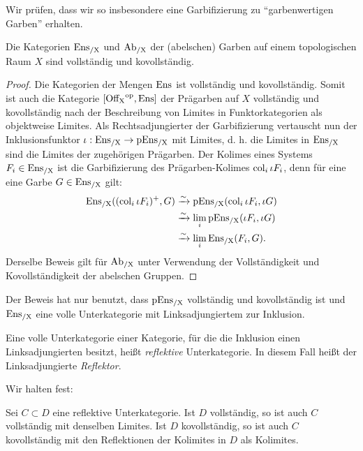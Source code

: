 Wir prüfen, dass wir so insbesondere eine Garbifizierung zu
``garbenwertigen Garben'' erhalten.
\begin{lemma} \label{ensx-complete}
  Die Kategorien $\operatorname{Ens_{/X}}$ und $\operatorname{Ab_{/X}}$ der (abelschen) Garben auf einem
  topologischen Raum $X$ sind vollständig und kovollständig.
\end{lemma}
\begin{proof}
  Die Kategorien der Mengen $\operatorname{Ens}$ ist vollständig und
  kovollständig. Somit ist auch die Kategorie $[\operatorname{Off_X}^\mathrm{op}, \operatorname{Ens}]$ der
  Prägarben auf $X$ vollständig und kovollständig nach der
  Beschreibung von Limites in Funktorkategorien als objektweise
  Limites. Als Rechtsadjungierter der Garbifizierung vertauscht nun
  der Inklusionsfunktor $\iota: \operatorname{Ens_{/X}} \to \operatorname{pEns_{/X}}$ mit Limites,
  d. h. die Limites in $\operatorname{Ens_{/X}}$ sind die Limites der zugehörigen
  Prägarben. Der Kolimes eines Systems $F_i \in \operatorname{Ens_{/X}}$ ist die
  Garbifizierung des Prägarben-Kolimes $\operatorname{col}_i \iota F_i$, denn für
  eine eine Garbe $G \in \operatorname{Ens_{/X}}$ gilt:
  \begin{align*}
    \operatorname{Ens_{/X}}((\operatorname{col}_i \iota F_i)^+, G)
    &\xrightarrow[]{\sim} \operatorname{pEns_{/X}}(\operatorname{col}_i \iota F_i, \iota G) \\
    &\xrightarrow[]{\sim} \lim_i \operatorname{pEns_{/X}}(\iota F_i, \iota G) \\
    &\xrightarrow[]{\sim} \lim_i \operatorname{Ens_{/X}}(F_i, G).
  \end{align*}
  Derselbe Beweis gilt für $\operatorname{Ab_{/X}}$ unter Verwendung der Vollständigkeit
  und Kovollständigkeit der abelschen Gruppen.
\end{proof}
Der Beweis hat nur benutzt, dass $\operatorname{pEns_{/X}}$ vollständig und
kovollständig ist und $\operatorname{Ens_{/X}}$ eine volle Unterkategorie mit
Linksadjungiertem zur Inklusion.
\begin{defn} \label{def:refl-sub}
  Eine volle Unterkategorie einer Kategorie, für die die Inklusion
  einen Linksadjungierten besitzt, heißt \emph{reflektive}
  Unterkategorie. In diesem Fall heißt der Linksadjungierte
  \emph{Reflektor}.
\end{defn}
Wir halten fest:
\begin{prop} \label{refl-sub-complete}
  Sei $C \subset D$ eine reflektive Unterkategorie. Ist $D$
  vollständig, so ist auch $C$ vollständig mit denselben Limites. Ist
  $D$ kovollständig, so ist auch $C$ kovollständig mit den
  Reflektionen der Kolimites in $D$ als Kolimites.
\end{prop}

